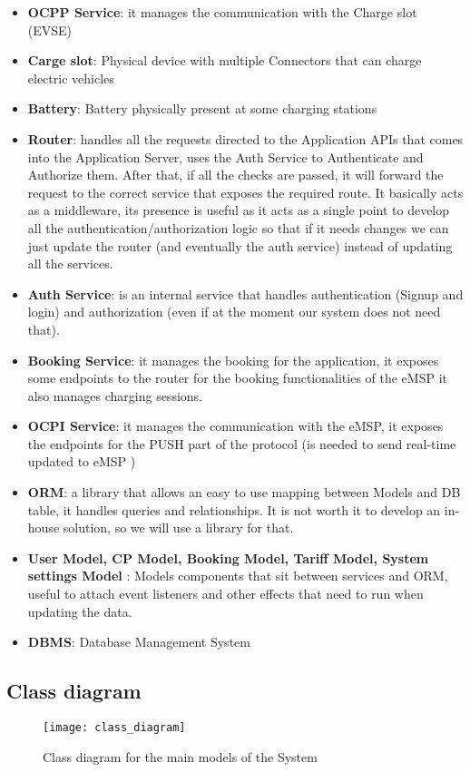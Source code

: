 \begin{itemize}
	\item \textbf{OCPP Service}: it manages the communication with the Charge slot (EVSE)
	\item \textbf{Carge slot}: Physical device with multiple Connectors that can charge electric vehicles
	\item \textbf{Battery}: Battery physically present at some charging stations
	\item \textbf{Router}: handles all the requests directed to the Application APIs that comes into the Application Server, uses the Auth Service to Authenticate and Authorize them. After that, if all the checks are passed, it will forward the request to the correct service that exposes the required route. It basically acts as a middleware, its presence is useful as it acts as a single point to develop all the authentication/authorization logic so that if it needs changes we can just update the router (and eventually the auth service) instead of updating all the services.
	\item \textbf{Auth Service}: is an internal service that handles authentication (Signup and login) and authorization (even if at the moment our system does not need that).
	\item \textbf{Booking Service}: it manages the booking for the application, it exposes some endpoints to the router for the booking functionalities of the eMSP it also manages charging sessions.
	\item \textbf{OCPI Service}: it manages the communication with the eMSP, it exposes the endpoints for the PUSH part of the protocol (is needed to send real-time updated to eMSP )
	\item \textbf{ORM}: a library that allows an easy to use mapping between Models and DB table, it handles queries and relationships. It is not worth it to develop an in-house solution, so we will use a library for that.
	\item \textbf{User Model, CP Model, Booking Model, Tariff Model, System settings Model }: Models components that sit between services and ORM, useful to attach event listeners and other effects that need to run when updating the data. 
	\item \textbf{DBMS}: Database Management System
\end{itemize}

\subsection{Class diagram}
\begin{figure}[h]
\texttt{[image: class\_diagram]}
\caption{Class diagram for the main models of the System}
\end{figure}
	
